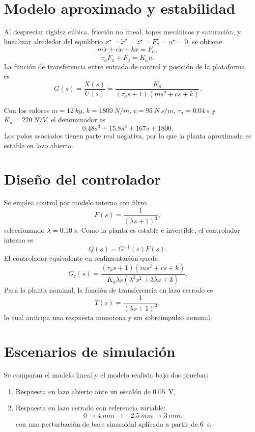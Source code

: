 \documentclass[conference]{IEEEtran}
\begin{document}
\section{Modelo aproximado y estabilidad}
Al despreciar rigidez c\'ubica, fricci\'on no lineal, topes mec\'anicos y saturaci\'on, y linealizar alrededor del equilibrio $x^\star=\dot{x}^\star=z^\star=F_a^\star=u^\star=0$, se obtiene
\begin{equation}
m\ddot{x}+c\dot{x}+kx=F_a,
\end{equation}
\begin{equation}
\tau_a \dot{F}_a+F_a=K_a u.
\end{equation}
La funci\'on de transferencia entre entrada de control y posici\'on de la plataforma es
\begin{equation}
G(s)=\frac{X(s)}{U(s)}=\frac{K_a}{(\tau_a s+1)(m s^2+c s+k)}.
\end{equation}

Con los valores $m=\SI{12}{kg}$, $k=\SI{1800}{N/m}$, $c=\SI{95}{N\,s/m}$, $\tau_a=\SI{0.04}{s}$ y $K_a=\SI{220}{N/V}$, el denominador es
\begin{equation}
0.48s^3+15.8s^2+167s+1800.
\end{equation}
Los polos asociados tienen parte real negativa, por lo que la planta aproximada es estable en lazo abierto.

\section{Dise\~no del controlador}
Se emplea control por modelo interno con filtro
\begin{equation}
F(s)=\frac{1}{(\lambda s+1)^3},
\end{equation}
seleccionando $\lambda=\SI{0.10}{s}$. Como la planta es estable e invertible, el controlador interno es
\begin{equation}
Q(s)=G^{-1}(s)F(s).
\end{equation}
El controlador equivalente en realimentaci\'on queda
\begin{equation}
G_c(s)=\frac{(\tau_a s+1)(m s^2+c s+k)}
{K_a \lambda s(\lambda^2 s^2+3\lambda s+3)}.
\end{equation}
Para la planta nominal, la funci\'on de transferencia en lazo cerrado es
\begin{equation}
T(s)=\frac{1}{(\lambda s+1)^3},
\end{equation}
lo cual anticipa una respuesta monotona y sin sobreimpulso nominal.

\section{Escenarios de simulaci\'on}
Se comparan el modelo lineal y el modelo realista bajo dos pruebas:
\begin{enumerate}
\item Respuesta en lazo abierto ante un escal\'on de \SI{0.05}{V}.
\item Respuesta en lazo cerrado con referencia variable:
\[
0 \rightarrow \SI{4}{mm} \rightarrow \SI{-2.5}{mm} \rightarrow \SI{3}{mm},
\]
con una perturbaci\'on de base sinusoidal aplicada a partir de \SI{6}{s}.
\end{enumerate}
\end{document}
